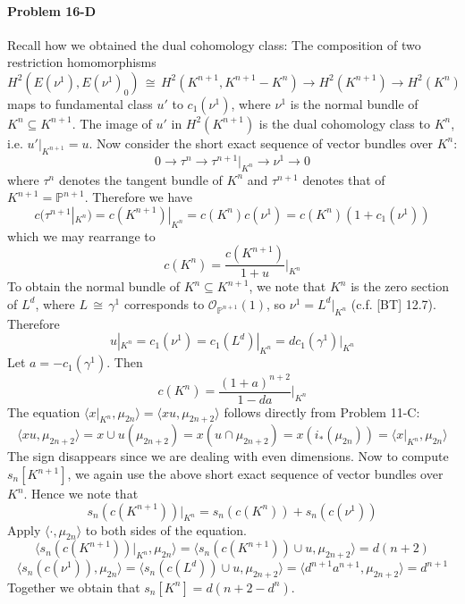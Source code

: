 \documentclass[12pt]{article}
\theoremstyle{plain}
\theoremstyle{definition}
\newcommand{\IP}{\mathbb{P}}
\newcommand\iso{\,{\cong}\,}
\newcommand{\<}{\langle}
\renewcommand{\>}{\rangle}
\begin{document}
\paragraph{Problem 16-D}
Recall how we obtained the dual cohomology class: The composition of two restriction homomorphisms 
$$ H^2(E(\nu^1), E(\nu^1)_0) \iso H^2(K^{n + 1}, K^{n + 1} - K^n) \to H^{2}(K^{n + 1}) \to H^2(K^n) $$
maps to fundamental class $u'$ to $c_1(\nu^1)$, where $\nu^1$ is the normal bundle of $K^n \subseteq K^{n + 1}$. The image of $u'$ in $H^2(K^{n + 1})$ is the dual cohomology class to $K^n$, i.e. $u'|_{K^{n + 1}} = u$. 
Now consider the short exact sequence of vector bundles over $K^n$:
$$ 0 \to \tau^n \to \tau^{n + 1}|_{K^n}  \to \nu^1 \to 0 $$
where $\tau^n$ denotes the tangent bundle of $K^n$ and $\tau^{n + 1}$ denotes that of $K^{n  + 1} = \IP^{n + 1}$. Therefore we have $$c(\tau^{n + 1}|_{K^n}) = c(K^{n + 1})|_{K^n} =  c(K^n)c(\nu^1) = c(K^n)(1 + c_1(\nu^1))$$
which we may rearrange to 
$$ c(K^n) = \frac{c(K^{n + 1})}{1 + u}|_{K^n} $$
To obtain the normal bundle of $K^n \subseteq K^{n + 1}$, we note that $K^n$ is the zero section of $L^d$, where $L \iso \gamma^1$ corresponds to $\mathcal{O}_{\IP^{n + 1}}(1)$, so $\nu^1 = L^d|_{K^n}$ (c.f. [BT] 12.7). Therefore 
$$ u|_{K^n} = c_1(\nu^1) = c_1(L^d)|_{K^n} = d c_1(\gamma^1)|_{K^n} $$
Let $a =  - c_1(\gamma^1)$. Then 
$$ c(K^n) = \frac{(1 + a)^{n + 2}}{1 - da}|_{K^n} $$
The equation $\< x|_{K^n}, \mu_{2n} \> = \< xu, \mu_{2n + 2}\>$ follows directly from Problem 11-C: 
$$ \< xu, \mu_{2n + 2}\> = x \cup u(\mu_{2n + 2}) = x(u \cap \mu_{2n + 2}) = x(i_*(\mu_{2n})) = \< x|_{K^{n}}, \mu_{2n} \> $$
The sign disappears since we are dealing with even dimensions. 
Now to compute $s_n[K^{n + 1}]$, we again use the above short exact sequence of vector bundles over $K^n$. Hence we note that
$$ s_n(c(K^{n + 1}))|_{K^n} = s_n(c(K^n)) + s_n(c(\nu^1)) $$
Apply $\< \cdot, \mu_{2n}\>$ to both sides of the equation. 
$$ \< s_n(c(K^{n + 1}))|_{K^n}, \mu_{2n} \> = \< s_n(c(K^{n + 1})) \cup u, \mu_{2n + 2} \> = d(n + 2)$$
$$ \< s_n(c(\nu^1)), \mu_{2n} \> = \< s_n(c(L^d)) \cup u, \mu_{2n + 2} \> = \< d^{n + 1} a^{n + 1}, \mu_{2n + 2} \> = d^{n + 1} $$
Together we obtain that $s_n[K^n] = d(n + 2 - d^n)$. 
\end{document}
